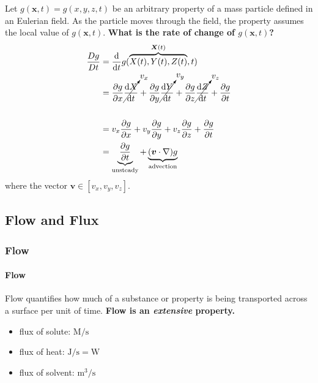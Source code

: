 \documentclass[12pt, a4paper]{article}
\begin{document}
\begin{tcolorbox}[breakable, title=\textbf{Derivation}] 
Let $g(\bm{x}, t) = g(x, y, z, t)$ be an arbitrary property of a mass particle defined in an Eulerian field. As the particle moves through the field, the property assumes the local value of $g(\bm{x}, t)$. \textbf{What is the rate of change of $g(\bm{x}, t)$?}
\begin{align*} 
\begin{split}
\frac{Dg}{Dt} 
    & =\frac{\mathrm{d}}{\mathrm{d}t}g(\overbrace{X(t),Y(t),Z(t)}^{\bm{X}(t)},t) \\
    & = \frac{\partial g}{\partial x} \cancelto{v_{x}}{\frac{\mathrm{d}X}{\mathrm{d}t}} + \frac{\partial g}{\partial y} \cancelto{v_{y}}{\frac{\mathrm{d}Y}{\mathrm{d}t}} + \frac{\partial g}{\partial z} \cancelto{v_{z}}{\frac{\mathrm{d}Z}{\mathrm{d}t}} + \frac{\partial g}{\partial t}\\\\
    & = v_{x}\frac{\partial g}{\partial x} + v_{y}\frac{\partial g}{\partial y} + v_{z}\frac{\partial g}{\partial z} + \frac{\partial g}{\partial t}\\
    & = \underbrace{\frac{\partial g}{\partial t}}_{\text{unsteady}} + \underbrace{(\bm{v} \cdot \nabla)g}_{\text{advection}}
\end{split} 
\end{align*}
where the vector $\bm{v} \in [v_x, v_y, v_z]$.
\end{tcolorbox}

\subsection{Flow and Flux}
\subsubsection{Flow}
\paragraph{Flow} Flow quantifies how much of a substance or property is being transported across a surface per unit of time. \textbf{Flow is an \emph{extensive} property.}

\begin{tcolorbox}[breakable, title = \textbf{Typical Units of Flows}]
    \begin{itemize}
        \item flux of solute: $\displaystyle \mathrm{M/s}$
        \item flux of heat: $\displaystyle \mathrm{J/s = W}$
        \item flux of solvent: $\displaystyle \mathrm{m^{3}/s}$
    \end{itemize}
\end{tcolorbox}
\end{document}
